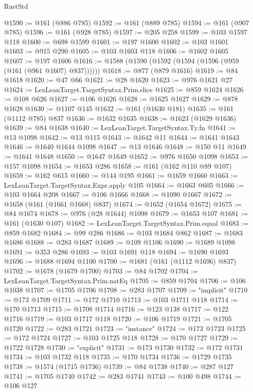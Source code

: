 \begin{lexlean}{RustStd}
\begin{coremodule}
{\begin{coremodule}
{{{{{{{{{{{{{{{{{{{{{{{{{{@1590 := @161 (@886 @785)
@1592 := @161 (@889 @785)
@1594 := @161 (@907 @785)
@1596 := @161 (@928 @785)
@1597 := @205 @258
@1599 := @103 @1597 @118
@1600 := @698 @1599
@1601 := @197 @1600
@1602 := @103 @1601
@1603 := @915 @290
@1605 := @103 @1603 @118
@1606 := @1602 @1605
@1607 := @197 @1606
@1616 := @1588 (@1590 (@1592 (@1594 (@1596 (@959 (@161 (@961 @1607) @837))))))
@1618 := @877 (@879 @1616)
@1619 := @84 @1618
@1620 := @47 @66
@1621 := @28 @1620
@1623 := @976 @1621 @27
@1624 := LexLeanTarget.TargetSyntax.Prim.slice
@1625 := @859 @1624
@1626 := @108 @626
@1627 := @106 @1626
@1628 := @1625 @1627
@1629 := @878 @1628
@1630 := @1107 @145
@1632 := @161 (@1630 @181)
@1635 := @161 (@1112 @785) @837
@1636 := @1632 @1635
@1638 := @1623 (@1629 @1636)
@1639 := @84 @1638
@1640 := LexLeanTarget.TargetSyntax.Ty.fn
@1641 := @13 @1098
@1642 := @13 @115
@1643 := @1642 @11
@1644 := @1641 @1643
@1646 := @1640 @1644 @1098
@1647 := @13 @1646
@1648 := @150 @11
@1649 := @1641 @1648
@1650 := @1647 @1649
@1652 := @976 @1650 @1098
@1653 := @157 @1098
@1654 := @1653 @286
@1658 := @161 (@162 @110 @89 @107)
@1659 := @162 @615
@1660 := @144 @195
@1661 := @1659 @1660
@1663 := LexLeanTarget.TargetSyntax.Expr.apply @105
@1664 := @1663 @605
@1666 := @103 @1664 @208
@1667 := @106 @1666
@1668 := @1090 @1667
@1672 := @1658 (@161 (@1661 @1668) @837)
@1674 := @1652 (@1654 @1672)
@1675 := @84 @1674
@1678 := @976 (@28 @1644) @1098
@1679 := @1653 @107
@1681 := @161 (@1630 @107)
@1682 := LexLeanTarget.TargetSyntax.Prim.equal
@1683 := @859 @1682
@1684 := @99 @286
@1686 := @103 @1684 @862
@1687 := @1683 @1686
@1688 := @283 @1687
@1689 := @109 @1106
@1690 := @1689 @1098
@1691 := @353 @286
@1693 := @103 @1691 @118
@1694 := @1690 @1693
@1696 := @1688 @1694 @1100
@1700 := @1681 (@161 (@1112 @1696) @837)
@1702 := @1678 (@1679 @1700)
@1703 := @84 @1702
@1704 := LexLeanTarget.TargetSyntax.Prim.natEq
@1705 := @859 @1704
@1706 := @106 @1038
@1707 := @1705 @1706
@1708 := @283 @1707
@1709 := "implicit"
@1710 := @173 @1709
@1711 := @172 @1710
@1713 := @103 @1711 @118
@1714 := @170 @1713
@1715 := @1708 @1714
@1716 := @123 @138
@1717 := @122 @1716
@1719 := @103 @1717 @118
@1720 := @106 @1719
@1721 := @1705 @1720
@1722 := @283 @1721
@1723 := "instance"
@1724 := @173 @1723
@1725 := @172 @1724
@1727 := @103 @1725 @118
@1728 := @170 @1727
@1729 := @1722 @1728
@1730 := "explicit"
@1731 := @173 @1730
@1732 := @172 @1731
@1734 := @103 @1732 @118
@1735 := @170 @1734
@1736 := @1729 @1735
@1738 := @1574 (@1715 @1736)
@1739 := @84 @1738
@1740 := @287 @127
@1741 := @1705 @1740
@1742 := @283 @1741
@1743 := @100 @498
@1744 := @106 @127
}}}}}}}}}}}}}}}}}}}}}}}}}}
\end{coremodule}}
\end{coremodule}
\end{lexlean}

